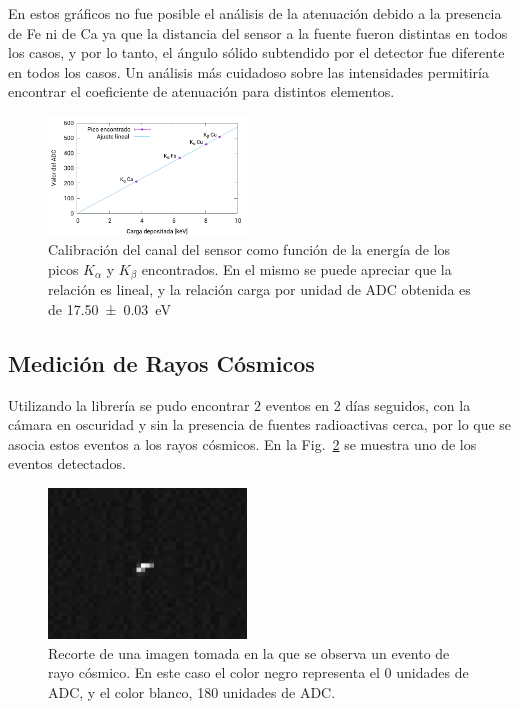 \documentclass[twoside,twocolumn]{article}
\begin{document}
      En estos gráficos no fue posible el análisis de la atenuación debido a la presencia de Fe ni de Ca
      ya que la distancia del sensor a la fuente fueron distintas en todos los casos, y por lo tanto,
      el ángulo sólido subtendido por el detector fue diferente en todos los casos.
      Un análisis más cuidadoso sobre las intensidades permitiría encontrar el coeficiente de atenuación para distintos elementos.

      \begin{figure}[h]
        \includegraphics[width=0.47\textwidth]{figures/x-ray_calibration}
        \caption{Calibración del canal del sensor como función de la energía de
          los picos $K_{\alpha}$ y $K_{\beta}$ encontrados.
          En el mismo se puede apreciar que la relación es lineal,
          y la relación carga por unidad de ADC obtenida es de \SI{17.50(3)}{\eV} %
        }
        \label{fig:x-ray_calibration}
      \end{figure}

    \subsection{Medición de Rayos Cósmicos}\label{sec:results:cosmic_ray}
      Utilizando la librería se pudo encontrar $2$ %
      eventos en 2 días seguidos, con la cámara en oscuridad y sin la presencia de fuentes radioactivas cerca,
      por lo que se asocia estos eventos a los rayos cósmicos.
      En la Fig.~\ref{fig:cosmic_ray} se muestra uno de los eventos detectados.

      \begin{figure}[
        h]
        \includegraphics[width=0.47\textwidth]{figures/06-04-18_12-25-40.png} %
        \caption{Recorte de una imagen tomada en la que se observa un evento de rayo cósmico.
        En este caso el color negro representa el 0 unidades de ADC, y el color blanco, 180 unidades de ADC.
        }
        \label{fig:cosmic_ray}
      \end{figure}
\end{document}
